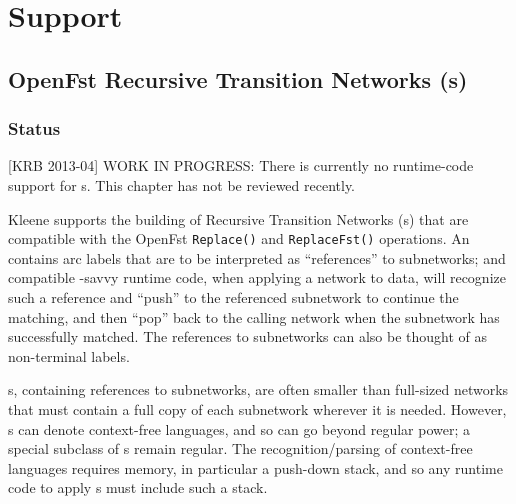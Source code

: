 \chapter{ Support}

\label{sec:openfstrtn}




\section{OpenFst Recursive Transition Networks (s)}

\subsection{Status}

[KRB 2013-04]  WORK IN PROGRESS:  There is currently no runtime-code support for
s.  This chapter has not be reviewed recently.

Kleene supports the building of Recursive Transition Networks
(s) that are compatible with the OpenFst \texttt{Replace()} and
\texttt{ReplaceFst()} operations.  An  contains arc labels that
are to be interpreted as ``references'' to subnetworks; and compatible
-savvy runtime code, when applying a network to data, will
recognize such a reference and ``push'' to the referenced subnetwork to
continue the matching, and then ``pop'' back to the calling network when
the subnetwork has successfully matched.  The references to subnetworks
can also be thought of as non-terminal labels.

s, containing references to subnetworks, are often smaller than
full-sized networks that must contain a full copy of each subnetwork
wherever it is needed.  However, s can denote context-free
languages, and so can go beyond regular power; a special subclass of
s remain regular.  The recognition/parsing of context-free
languages requires memory, in particular a push-down stack, and so any
runtime code to apply s must include such a stack.

